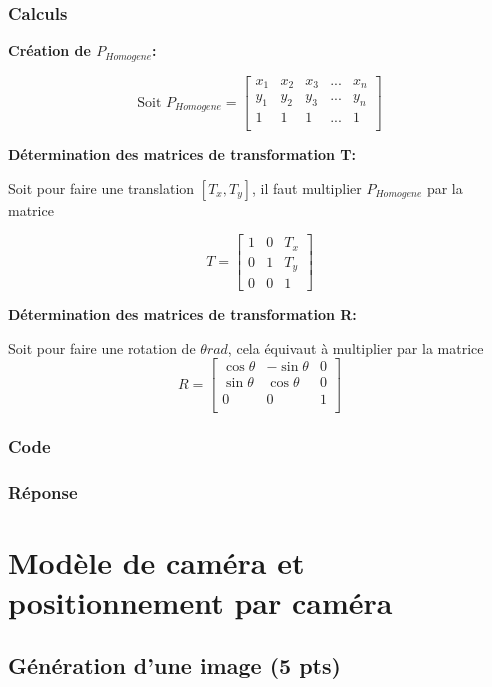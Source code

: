 \documentclass[12pt]{article}
\begin{document}
\subsubsection{Calculs}
\textbf{Création de $P_{Homogene}$:}

\[ \text{Soit } P_{Homogene} =
\begin{bmatrix}
    x_1 & x_2 & x_3 & ... & x_n \\
    y_1 & y_2 & y_3 & ... & y_n \\
    1   & 1   & 1   & ... & 1   \\
\end{bmatrix}
\]

\textbf{D\'etermination des matrices de transformation T:}

Soit pour faire une translation $[T_x, T_y]$, il faut multiplier $P_{Homogene}$ par la matrice

\[
    T =
    \begin{bmatrix}
        1 & 0 & T_{x} \\
        0 & 1 & T_{y} \\
        0 & 0 & 1
    \end{bmatrix}
    \]

\textbf{D\'etermination des matrices de transformation R:}

Soit pour faire une rotation de $\theta rad$, cela \'equivaut \`a multiplier par la matrice
\[
    R =
    \begin{bmatrix}
        \cos{\theta} & -\sin{\theta} & 0 \\
        \sin{\theta} & \cos{\theta} & 0 \\
        0 & 0 & 1 \\
    \end{bmatrix}
    \]

\subsubsection{Code}


\subsubsection{Réponse}

\newpage
\section{Modèle de caméra et positionnement par caméra}

\subsection{Génération d'une image (5 pts)}
\label{generation_image}
\end{document}
